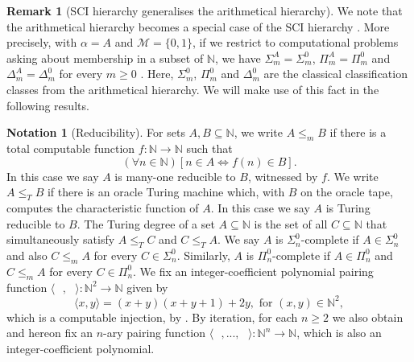 \documentclass[10pt, a4paper, reqno]{amsart}
\numberwithin{equation}{section}
\renewcommand{\geq}{\geqslant}
\renewcommand{\leq}{\leqslant}
\theoremstyle{definition}
\newtheorem{remark}[theorem]{Remark}
\theoremstyle{definition}
\newtheorem*{notation}{Notation}
\begin{document}
\begin{remark}[SCI hierarchy generalises the arithmetical hierarchy]
We note that the arithmetical hierarchy becomes a special case of the SCI hierarchy \cite[Proposition~A.8]{SCI}. More precisely, with $\alpha = A$ and $\mathcal{M} = \{0, 1\}$, if we restrict to computational problems asking about membership in a subset of $\mathbb{N}$, we have $\Sigma_{m}^{A} = \Sigma_{m}^{0}$, $\Pi_{m}^{A} = \Pi_{m}^{0}$ and $\Delta_{m}^{A} = \Delta_{m}^{0}$ for every $m \geq 0$ \cite[Proposition~A.8]{SCI}. 
Here, $\Sigma_{m}^{0}$,  $\Pi_{m}^{0}$ and $\Delta_{m}^{0}$ are the classical classification classes from the arithmetical hierarchy.   
We will make use of this fact in the following results.
\end{remark}

\begin{notation}[Reducibility]
For sets $A,B\subseteq\mathbb N$, we write $A \leq_m B$ if there is a total computable function $f:\mathbb N\to\mathbb N$ such that
\[
(\forall n \in \mathbb{N}) [ n\in A\iff f(n)\in B].
\]
In this case we say $A$ is many-one reducible to $B$, witnessed by $f$.
We write $A \leq_T B$ if there is an oracle Turing machine which, with $B$ on the oracle tape, computes the characteristic function of $A$. In this case we say $A$ is Turing reducible to $B$.
The Turing degree of a set $A \subseteq \mathbb{N}$ is the set of all $C \subseteq \mathbb{N}$ that simultaneously satisfy $A \leq_T C$ and $C \leq_T A$.
We say $A$ is $\Sigma_{n}^{0}$-complete if $A \in \Sigma_{n}^{0}$ and also $C \leq_m A$ for every $C \in \Sigma_{n}^{0}$. Similarly, $A$ is $\Pi_{n}^{0}$-complete if $A \in \Pi_{n}^{0}$ and $C \leq_m A$ for every $C \in \Pi_{n}^{0}$.
We fix an integer-coefficient polynomial pairing function $\langle \textrm{ } , \textrm{ } \rangle : \mathbb{N}^2 \to \mathbb{N}$ given by
\begin{equation*}
\langle x, y \rangle = (x + y)(x + y + 1) + 2y, \textrm{ for  } (x, y) \in \mathbb{N}^2,
\end{equation*}
which is a computable injection, by \cite[Section~1, p.~1001]{Nathanson2016}. By iteration, for each $n \geq 2$ we also obtain and hereon fix an $n$-ary pairing function $\langle \textrm{ }, ..., \textrm{ } \rangle : \mathbb{N}^n \to \mathbb{N}$, which is also an integer-coefficient polynomial.
\end{notation}
\end{document}
